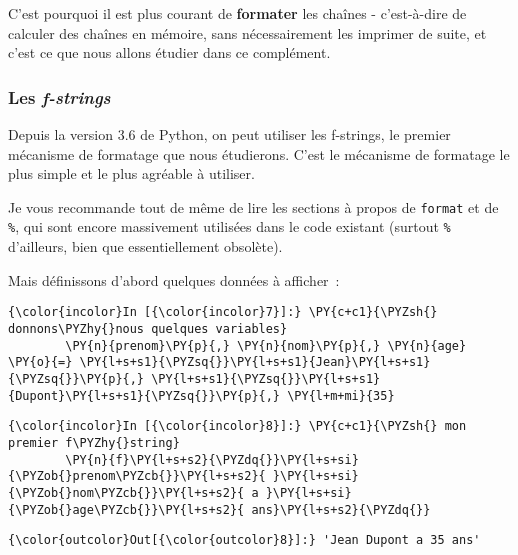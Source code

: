 C'est pourquoi il est plus courant de \textbf{formater} les chaînes -
c'est-à-dire de calculer des chaînes en mémoire, sans nécessairement les
imprimer de suite, et c'est ce que nous allons étudier dans ce
complément.

    \hypertarget{les-f-strings}{%
\subsubsection{\texorpdfstring{Les
\emph{f-strings}}{Les f-strings}}\label{les-f-strings}}

    Depuis la version 3.6 de Python, on peut utiliser les f-strings, le
premier mécanisme de formatage que nous étudierons. C'est le mécanisme
de formatage le plus simple et le plus agréable à utiliser.

Je vous recommande tout de même de lire les sections à propos de
\texttt{format} et de \texttt{\%}, qui sont encore massivement utilisées
dans le code existant (surtout \texttt{\%} d'ailleurs, bien que
essentiellement obsolète).

    Mais définissons d'abord quelques données à afficher~:

    \begin{Verbatim}[commandchars=\\\{\},frame=single,framerule=0.3mm,rulecolor=\color{cellframecolor}]
{\color{incolor}In [{\color{incolor}7}]:} \PY{c+c1}{\PYZsh{} donnons\PYZhy{}nous quelques variables}
        \PY{n}{prenom}\PY{p}{,} \PY{n}{nom}\PY{p}{,} \PY{n}{age} \PY{o}{=} \PY{l+s+s1}{\PYZsq{}}\PY{l+s+s1}{Jean}\PY{l+s+s1}{\PYZsq{}}\PY{p}{,} \PY{l+s+s1}{\PYZsq{}}\PY{l+s+s1}{Dupont}\PY{l+s+s1}{\PYZsq{}}\PY{p}{,} \PY{l+m+mi}{35}
\end{Verbatim}


    \begin{Verbatim}[commandchars=\\\{\},frame=single,framerule=0.3mm,rulecolor=\color{cellframecolor}]
{\color{incolor}In [{\color{incolor}8}]:} \PY{c+c1}{\PYZsh{} mon premier f\PYZhy{}string}
        \PY{n}{f}\PY{l+s+s2}{\PYZdq{}}\PY{l+s+si}{\PYZob{}prenom\PYZcb{}}\PY{l+s+s2}{ }\PY{l+s+si}{\PYZob{}nom\PYZcb{}}\PY{l+s+s2}{ a }\PY{l+s+si}{\PYZob{}age\PYZcb{}}\PY{l+s+s2}{ ans}\PY{l+s+s2}{\PYZdq{}}
\end{Verbatim}


\begin{Verbatim}[commandchars=\\\{\},frame=single,framerule=0.3mm,rulecolor=\color{cellframecolor}]
{\color{outcolor}Out[{\color{outcolor}8}]:} 'Jean Dupont a 35 ans'
\end{Verbatim}
            
